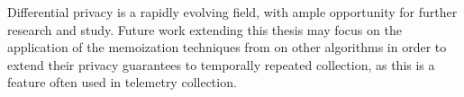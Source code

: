 \documentclass[a4paper,12pt]{article}
\begin{document}
Differential privacy is a rapidly evolving field, with ample opportunity for further research and study. Future work extending this thesis may focus on the application of the memoization techniques from \cite{microsoft_telemetry} on other algorithms in order to extend their privacy guarantees to temporally repeated collection, as this is a feature often used in telemetry collection.

\newpage

\printbibliography[heading=bibintoc]
\end{document}
